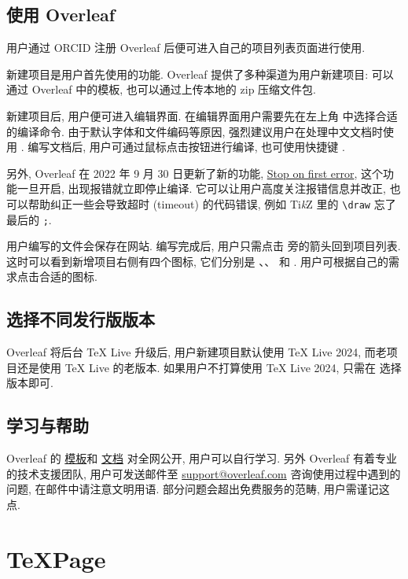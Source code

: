 \subsection{使用 Overleaf}

用户通过 ORCID 注册 Overleaf 后便可进入自己的项目列表页面进行使用.

新建项目是用户首先使用的功能.
Overleaf 提供了多种渠道为用户新建项目:
可以通过 Overleaf 中的模板,
也可以通过上传本地的 \textsf{zip} 压缩文件包.

新建项目后,
用户便可进入编辑界面.
在编辑界面用户需要先在左上角  中选择合适的编译命令.
由于默认字体和文件编码等原因,
强烈建议用户在处理中文文档时使用 .
编写文档后,
用户可通过鼠标点击按钮进行编译,
也可使用快捷键 .

另外,
Overleaf 在 2022 年 9 月 30 日更新了新的功能,
\href{https://www.overleaf.com/blog/new-feature-stop-on-first-error-compilation-mode}{Stop on first error},
这个功能一旦开启,
出现报错就立即停止编译.
它可以让用户高度关注报错信息并改正,
也可以帮助纠正一些会导致超时 (timeout) 的代码错误,
例如 Ti\textit kZ 里的 \verb+\draw+ 忘了最后的 \verb+;+.

用户编写的文件会保存在网站.
编写完成后,
用户只需点击  旁的箭头回到项目列表.
这时可以看到新增项目右侧有四个图标,
它们分别是 、、 和 .
用户可根据自己的需求点击合适的图标.

\subsection{选择不同发行版版本}

Overleaf 将后台 \TeX{} Live 升级后,
用户新建项目默认使用 \TeX{} Live 2024,
而老项目还是使用 \TeX{} Live 的老版本.
如果用户不打算使用 \TeX{} Live 2024,
只需在  选择版本即可.

\subsection{学习与帮助}

Overleaf 的%
\href{https://www.overleaf.com/latex/templates}{模板}和%
\href{https://www.overleaf.com/learn}{文档}%
对全网公开,
用户可以自行学习.
另外 Overleaf 有着专业的技术支援团队,
用户可发送邮件至 \href{mailto:support@overleaf.com}%
{\ttfamily support@overleaf.com}
咨询使用过程中遇到的问题,
在邮件中请注意文明用语.
部分问题会超出免费服务的范畴,
用户需谨记这点.

\section{TeXPage}

